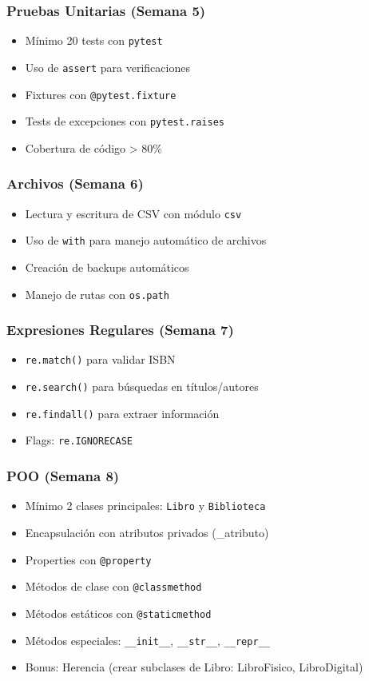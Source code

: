 \documentclass[12pt,a4paper]{article}
\begin{document}
\subsubsection{Pruebas Unitarias (Semana 5)}
\begin{itemize}[leftmargin=*]
    \item Mínimo 20 tests con \texttt{pytest}
    \item Uso de \texttt{assert} para verificaciones
    \item Fixtures con \texttt{@pytest.fixture}
    \item Tests de excepciones con \texttt{pytest.raises}
    \item Cobertura de código > 80\%
\end{itemize}

\subsubsection{Archivos (Semana 6)}
\begin{itemize}[leftmargin=*]
    \item Lectura y escritura de CSV con módulo \texttt{csv}
    \item Uso de \texttt{with} para manejo automático de archivos
    \item Creación de backups automáticos
    \item Manejo de rutas con \texttt{os.path}
\end{itemize}

\subsubsection{Expresiones Regulares (Semana 7)}
\begin{itemize}[leftmargin=*]
    \item \texttt{re.match()} para validar ISBN
    \item \texttt{re.search()} para búsquedas en títulos/autores
    \item \texttt{re.findall()} para extraer información
    \item Flags: \texttt{re.IGNORECASE}
\end{itemize}

\subsubsection{POO (Semana 8)}
\begin{itemize}[leftmargin=*]
    \item Mínimo 2 clases principales: \texttt{Libro} y \texttt{Biblioteca}
    \item Encapsulación con atributos privados (\_atributo)
    \item Properties con \texttt{@property}
    \item Métodos de clase con \texttt{@classmethod}
    \item Métodos estáticos con \texttt{@staticmethod}
    \item Métodos especiales: \texttt{\_\_init\_\_}, \texttt{\_\_str\_\_}, \texttt{\_\_repr\_\_}
    \item Bonus: Herencia (crear subclases de Libro: LibroFisico, LibroDigital)
\end{itemize}
\end{document}
